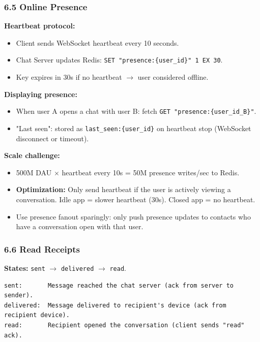 \documentclass[11pt]{article}
\providecommand{\tightlist}{\setlength{\itemsep}{1pt}\setlength{\parskip}{0pt}}
\begin{document}
\subsubsection{6.5 Online Presence}\label{65-online-presence}

\textbf{Heartbeat protocol:}

\begin{itemize}
\tightlist
\item
  Client sends WebSocket heartbeat every 10 seconds.
\item
  Chat Server updates Redis: \texttt{SET\ "presence:\{user\_id\}"\ 1\ EX\ 30}.
\item
  Key expires in 30s if no heartbeat \(\rightarrow\) user considered offline.
\end{itemize}

\textbf{Displaying presence:}

\begin{itemize}
\tightlist
\item
  When user A opens a chat with user B: fetch \texttt{GET\ "presence:\{user\_id\_B\}"}.
\item
  "Last seen": stored as \texttt{last\_seen:\{user\_id\}} on heartbeat stop (WebSocket disconnect or timeout).
\end{itemize}

\textbf{Scale challenge:}

\begin{itemize}
\tightlist
\item
  500M DAU \(\times\) heartbeat every 10s = 50M presence writes/sec to Redis.
\item
  \textbf{Optimization:} Only send heartbeat if the user is actively viewing a conversation. Idle app = slower heartbeat (30s). Closed app = no heartbeat.
\item
  Use presence fanout sparingly: only push presence updates to contacts who have a conversation open with that user.
\end{itemize}

\subsubsection{6.6 Read Receipts}\label{66-read-receipts}

\textbf{States:} \texttt{sent} \(\rightarrow\) \texttt{delivered} \(\rightarrow\) \texttt{read}.

\setcodelang{}

\begin{verbatim}
sent:       Message reached the chat server (ack from server to sender).
delivered:  Message delivered to recipient's device (ack from recipient device).
read:       Recipient opened the conversation (client sends "read" ack).
\end{verbatim}
\end{document}
